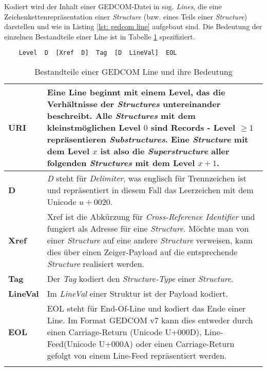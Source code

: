 {Kodiert wird der Inhalt einer GEDCOM-Datei in sog. \textit{Lines}, die eine Zeichenkettenrepräsentation einer \textit{Structure} (bzw. eines Teils einer \textit{Structure}) darstellen und wie in Listing \ref{lst: gedcom line} aufgebaut sind. Die Bedeutung der einzelnen Bestandteile einer Line ist in Tabelle \ref{tab: gedcom line} spezifiziert.
\vspace{1em}
\begin{lstlisting}
	Level  D  [Xref  D]  Tag  [D  LineVal]  EOL
\end{lstlisting}
\label{lst: gedcom line}
\newpage
\bgroup
\def\arraystretch{1.5}%
\setlength{\tabcolsep}{18pt}
\begin{longtable}{|p{2cm}|p{10cm}|}
	\hline
	\textbf{URI} & Eine Line beginnt mit einem Level, das die Verhältnisse der \textit{Structures} untereinander beschreibt. Alle \textit{Structures} mit dem kleinstmöglichen Level $0$ sind Records - Level $\ge1$ repräsentieren \textit{Substructures}. Eine \textit{Structure} mit dem Level $x$ ist also die \textit{Superstructure} aller folgenden \textit{Structures} mit dem Level $x+1$. \\
	\hline
	\textbf{D} & \textit{D} steht für \textit{Delimiter}, was englisch für Trennzeichen ist und repräsentiert in diesem Fall das Leerzeichen mit dem Unicode $u+0020$. \\
	\hline
	\textbf{Xref} & Xref ist die Abkürzung für \textit{Cross-Reference Identifier} und fungiert als Adresse für eine \textit{Structure}. Möchte man von einer \textit{Structure} auf eine andere \textit{Structure} verweisen, kann dies über einen Zeiger-Payload auf die entsprechende \textit{Structure} realisiert werden.\\
	\hline
	\textbf{Tag} & Der \textit{Tag} kodiert den \textit{Structure-Type} einer \textit{Structure}.\\
	\hline
	\textbf{LineVal} & Im \textit{LineVal} einer Struktur ist der Payload kodiert.\\
	\hline
	\textbf{EOL} & EOL steht für End-Of-Line und kodiert das Ende einer Line. Im Format GEDCOM v7 kann dies entweder durch einen Carriage-Return (Unicode U+000D), Line-Feed(Unicode U+000A) oder einen Carriage-Return gefolgt von einem Line-Feed repräsentiert werden.\\
	\hline
	\caption{Bestandteile einer GEDCOM Line und ihre Bedeutung} %
	\label{tab: gedcom line}

\end{longtable}}

